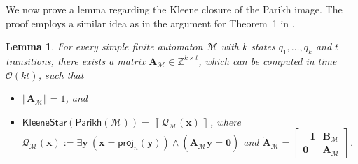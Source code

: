 \documentclass[10pt,a4paper]{article}
\newtheorem{lemma}[theorem]{Lemma}
\theoremstyle{definition}
\theoremstyle{remark}
\newcommand{\cM}{\mathcal{M}}
\newcommand{\cO}{\mathcal{O}}
\newcommand{\cQ}{\mathcal{Q}}
\newcommand{\bbZ}{\mathbb{Z}}
\newcommand{\bfA}{\mathbf{A}}
\newcommand{\bfAtilde}{\tilde{\mathbf{A}}}
\newcommand{\bfB}{\mathbf{B}}
\newcommand{\bfI}{\mathbf{I}}
\newcommand{\bfx}{\mathbf{x}}
\newcommand{\bfy}{\mathbf{y}}
\newcommand{\bfzero}{\mathbf{0}}
\newcommand{\norm}[1]        {\left\Vert #1 \right\Vert}
\newcommand{\projp}[2]     {\mathsf{proj}_{ #1 }\left( #2 \right)}
\newcommand{\kstar}[1] {\mathsf{KleeneStar}\left( #1 \right)}
\newcommand{\parikh}[1] {\mathsf{Parikh}\left( #1 \right)}
\newcommand{\sol}[1] {\left\llbracket #1 \right\rrbracket}
\newcommand{\bigO}[1] {{\cO\left( #1 \right)}}
\begin{document}
We now prove a  lemma regarding the Kleene closure of the Parikh image.
The proof employs a similar idea as in the argument for Theorem~1 in \cite{tree}.

\begin{lemma}\label{lem:kstar_nfa}
    For every simple finite automaton $\cM$ with $k$ states $q_1, \ldots,q_k$ and $t$ transitions,
    there exists a matrix $\bfA_\cM \in \bbZ^{k \times t}$,
    which can be computed in time $\bigO{kt}$,
    such that
    \begin{itemize}
        \item $\norm{\bfA_\cM} = 1$, and
        \item $\kstar{\parikh{\cM}} =
            \sol{\cQ_\cM(\bfx)}$,
            where
            $\cQ_\cM(\bfx) := \exists \bfy\ (\bfx = \projp{n}{\bfy}) \land (\tilde{\bfA}_\cM \bfy = \bfzero)$ and
            $\bfAtilde_\cM = 
            \left[
                \begin{array}{r|r}
                    -\bfI & \bfB_\cM \\
                    \hline
                    \bfzero& \bfA_\cM
                \end{array}
            \right]$.
    \end{itemize}
\end{lemma}
\end{document}
